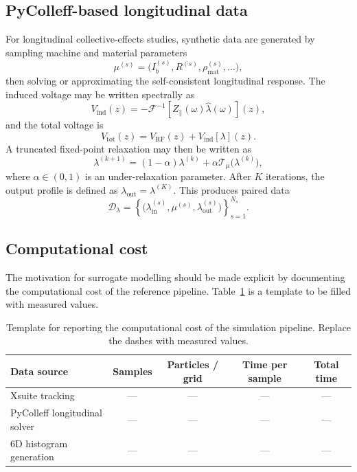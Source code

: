 \documentclass[11pt,a4paper]{article}
\begin{document}
\begin{sloppypar}
\subsection{PyColleff-based longitudinal data}
For longitudinal collective-effects studies, synthetic data are generated by sampling machine and material parameters
\begin{equation}
    \mu^{(s)}=\big(I_b^{(s)},R^{(s)},\rho_{\mathrm{mat}}^{(s)},\ldots\big),
\end{equation}
then solving or approximating the self-consistent longitudinal response. The induced voltage may be written spectrally as
\begin{equation}
    V_{\mathrm{ind}}(z)=-\mathcal{F}^{-1}\left[Z_{\parallel}(\omega)\widehat{\lambda}(\omega)\right](z),
    \label{eq:induced_voltage_revised}
\end{equation}
and the total voltage is
\begin{equation}
    V_{\mathrm{tot}}(z)=V_{\mathrm{RF}}(z)+V_{\mathrm{ind}}[\lambda](z).
\end{equation}
A truncated fixed-point relaxation may then be written as
\begin{equation}
    \lambda^{(k+1)}=(1-\alpha)\lambda^{(k)}+\alpha\mathcal{T}_{\mu}\big(\lambda^{(k)}\big),
    \label{eq:pycolleff_relaxation_revised}
\end{equation}
where $\alpha\in(0,1)$ is an under-relaxation parameter. After $K$ iterations, the output profile is defined as $\lambda_{\mathrm{out}}=\lambda^{(K)}$. This produces paired data
\begin{equation}
    \mathcal{D}_{\lambda}=\left\{\big(\lambda_{\mathrm{in}}^{(s)},\mu^{(s)},\lambda_{\mathrm{out}}^{(s)}\big)\right\}_{s=1}^{N_s}.
\end{equation}

\subsection{Computational cost}
The motivation for surrogate modelling should be made explicit by documenting the computational cost of the reference pipeline. Table~\ref{tab:simulation_cost_template} is a template to be filled with measured values.

\begin{table}[H]
\centering
\caption{Template for reporting the computational cost of the simulation pipeline. Replace the dashes with measured values.}
\label{tab:simulation_cost_template}
\begin{tabular}{lcccc}
\toprule
Data source & Samples & Particles / grid & Time per sample & Total time \\
\midrule
Xsuite tracking & --- & --- & --- & --- \\
PyColleff longitudinal solver & --- & --- & --- & --- \\
6D histogram generation & --- & --- & --- & --- \\
\bottomrule
\end{tabular}
\end{table}


\end{sloppypar}
\end{document}

